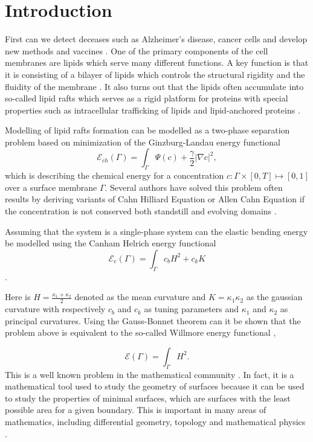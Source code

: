 \section{Introduction}\label{sec:introduction}



First can we detect deceases such as Alzheimer's disease, cancer cells and develop new methods and vaccines \cite{small2006sorting}. One of the primary components of the cell membranes are lipids which serve many different functions. A key function is that it is consisting of a bilayer of lipids which controls the structural rigidity and the fluidity of the membrane \cite{ neidleman87}. It also turns out that the lipids often accumulate into so-called lipid rafts which serves as a rigid platform for proteins with special properties such as intracellular trafficking of lipids and lipid-anchored proteins \cite{Edidin03}.

Modelling of lipid rafts formation can be modelled as a two-phase separation problem based on minimization of the Ginzburg-Landau energy functional \cite{yushutin19}
\[
\mathcal{E}_{ch}  \left( \Gamma  \right) = \int_{\Gamma  }^{}\Psi \left( c \right) + \frac{\gamma}{2} \left\lvert \nabla c \right\rvert^{2} ,
\]
which is describing the chemical energy for a concentration $c: \Gamma \times \left[ 0,T \right] \mapsto  \left[ 0,1 \right]  $ over a surface membrane $\Gamma$. Several authors have solved this problem often results by deriving variants of Cahn
Hilliard Equation or Allen Cahn Equation if the concentration is not conserved both standstill and evolving domains \cite{yushutin19, udo97, ratz16,Gera2017, caetano21,yushutin19} .

Assuming that the system is a single-phase system can the elastic bending energy be modelled using the Canham Helrich energy functional \cite{wang08, udo97} \[
\mathcal{E} _{e}\left( \Gamma  \right) =   \int_{\Gamma }^{}  c_{b} H^{2} + c_{k} K
\].

Here is $H = \frac{ \kappa_1 + \kappa_2 }{2}$ denoted as the mean curvature and $K = \kappa_1 \kappa_2$ as the gaussian curvature with respectively $c_{b}$ and $c_{k}$ as tuning parameters and $\kappa_1$ and $\kappa_2$ as principal curvatures. Using
the Gauss-Bonnet theorem can it be shown that the problem above is equivalent to the so-called Willmore energy
functional \cite[Ch 8.5 Thm 8.29]{montiel2009curves},

\begin{equation}
\label{eq:WE}
\mathcal{E} \left( \Gamma  \right) = \int_{\Gamma }^{}  H ^2
.\end{equation}
This is a well known problem in the mathematical community \cite{ topping2000towards, marques2014willmore}. In fact, it is a mathematical tool used to study the geometry of surfaces because it can be used to study the properties of minimal surfaces, which are surfaces with the least possible area for a given boundary. This is important in many areas of mathematics, including differential geometry, topology and mathematical physics \cite{koerber2021area,jakob2022singularities, rupp21}.

